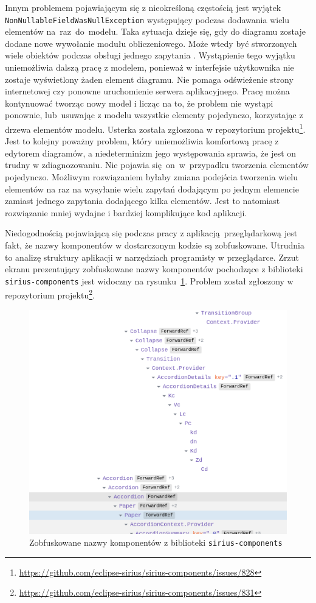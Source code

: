 Innym problemem pojawiającym się z nieokreśloną częstością jest wyjątek
\texttt{NonNullable\-FieldWasNullException} występujący podczas
dodawania wielu
elementów na~raz~do~modelu. Taka sytuacja dzieje się, gdy do diagramu zostaje
dodane nowe wywołanie modułu obliczeniowego. Może wtedy być stworzonych wiele
obiektów podczas obsługi jednego zapytania \GraphQL{}. Wystąpienie tego
wyjątku uniemożliwia dalszą pracę z modelem, ponieważ w interfejsie użytkownika
nie zostaje wyświetlony żaden element diagramu. Nie pomaga odświeżenie strony
internetowej czy ponowne uruchomienie serwera aplikacyjnego. Pracę można
kontynuować tworząc nowy model i licząc na to, że problem nie wystąpi ponownie,
lub~usuwając z modelu wszystkie elementy pojedynczo, korzystając z drzewa
elementów modelu. Usterka została zgłoszona w repozytorium
projektu\footnote{
	\url{https://github.com/eclipse-sirius/sirius-components/issues/828}
}. Jest to kolejny poważny problem, który uniemożliwia komfortową pracę z
edytorem diagramów, a niedeterminizm jego występowania sprawia, że jest on
trudny w zdiagnozowaniu. Nie pojawia się~on~w~przypadku tworzenia elementów
pojedynczo. Możliwym rozwiązaniem byłaby zmiana podejścia tworzenia wielu
elementów na raz na wysyłanie wielu zapytań \GraphQL{} dodającym po jednym
elemencie zamiast jednego zapytania dodającego kilka elementów. Jest to
natomiast rozwiązanie mniej wydajne i bardziej komplikujące kod aplikacji.

Niedogodnością pojawiającą się podczas pracy z aplikacją przeglądarkową
\SiriusWeb{} jest fakt, że nazwy komponentów w dostarczonym kodzie
\JavaScript{} są zobfuskowane. Utrudnia to analizę struktury aplikacji w
narzędziach programisty w przeglądarce. Zrzut ekranu prezentujący zobfuskowane
nazwy komponentów pochodzące z biblioteki \texttt{sirius-components} jest
widoczny na rysunku~\ref{rys:sirius-web-minified-component-names}. Problem
został zgłoszony w repozytorium
projektu\footnote{
	\url{https://github.com/eclipse-sirius/sirius-components/issues/831}
}.

\begin{figure}[!ht]
  \centering

  \includegraphics[width=0.7\linewidth]{./images/sirius-web-minified-component-names.png}
  \caption{Zobfuskowane nazwy komponentów z biblioteki
    \texttt{sirius-components}}\label{rys:sirius-web-minified-component-names}
\end{figure}


